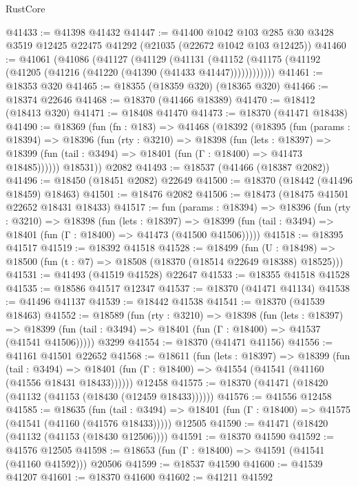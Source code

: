 \begin{lexlean}{RustCore}
\begin{coremodule}
@41433 := @41398 @41432
@41447 := @41400
    @1042
    @103
    @285
    @30
    @3428
    @3519
    @12425
    @22475
    @41292
    (@21035 (@22672 @1042 @103 @12425))
@41460 := @41061
    (@41086
      (@41127
        (@41129
          (@41131 (@41152 (@41175 (@41192 (@41205 (@41216 (@41220 (@41390 (@41433 @41447))))))))))))
@41461 := @18353 @320
@41465 := @18355 (@18359 @320) (@18365 @320)
@41466 := @18374 @22646
@41468 := @18370 (@41466 @18389)
@41470 := @18412 (@18413 @320)
@41471 := @18408 @41470
@41473 := @18370 (@41471 @18438)
@41490 := @18369
    (fun (fn : @183) =>
    @41468
      (@18392
        (@18395
          (fun (params : @18394) =>
          @18396
            (fun (rty : @3210) =>
            @18398
              (fun (lets : @18397) =>
              @18399 (fun (tail : @3494) => @18401 (fun (Γ : @18400) => @41473 @18485))))))
        @18531))
    @2082
@41493 := @18537 (@41466 (@18387 @2082))
@41496 := @18450 (@18451 @2082) @22649
@41500 := @18370 (@18442 (@41496 @18459) @18463)
@41501 := @18476 @2082
@41506 := @18473 (@18475 @41501 @22652 @18431 @18433)
@41517 := fun (params : @18394) =>
  @18396
    (fun (rty : @3210) =>
    @18398
      (fun (lets : @18397) =>
      @18399 (fun (tail : @3494) => @18401 (fun (Γ : @18400) => @41473 (@41500 @41506)))))
@41518 := @18395 @41517
@41519 := @18392 @41518
@41528 := @18499
    (fun (U : @18498) => @18500 (fun (t : @7) => @18508 (@18370 (@18514 @22649 @18388) @18525)))
@41531 := @41493 (@41519 @41528) @22647
@41533 := @18355 @41518 @41528
@41535 := @18586 @41517 @12347
@41537 := @18370 (@41471 @41134)
@41538 := @41496 @41137
@41539 := @18442 @41538
@41541 := @18370 (@41539 @18463)
@41552 := @18589
    (fun (rty : @3210) =>
    @18398
      (fun (lets : @18397) =>
      @18399 (fun (tail : @3494) => @18401 (fun (Γ : @18400) => @41537 (@41541 @41506)))))
    @3299
@41554 := @18370 (@41471 @41156)
@41556 := @41161 @41501 @22652
@41568 := @18611
    (fun (lets : @18397) =>
    @18399
      (fun (tail : @3494) =>
      @18401 (fun (Γ : @18400) => @41554 (@41541 (@41160 (@41556 @18431 @18433))))))
    @12458
@41575 := @18370 (@41471 (@18420 (@41132 (@41153 (@18430 (@12459 @18433))))))
@41576 := @41556 @12458
@41585 := @18635
    (fun (tail : @3494) => @18401 (fun (Γ : @18400) => @41575 (@41541 (@41160 (@41576 @18433)))))
    @12505
@41590 := @41471 (@18420 (@41132 (@41153 (@18430 @12506))))
@41591 := @18370 @41590
@41592 := @41576 @12505
@41598 := @18653 (fun (Γ : @18400) => @41591 (@41541 (@41160 @41592))) @20506
@41599 := @18537 @41590
@41600 := @41539 @41207
@41601 := @18370 @41600
@41602 := @41211 @41592

\end{coremodule}
\end{lexlean}
